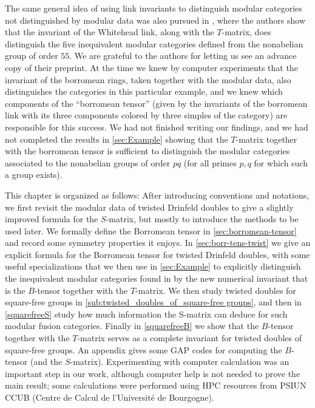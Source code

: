 \documentclass[a4paper, 10pt]{book}
\theoremstyle{definition}
\numberwithin{equation}{chapter}
\begin{document}
The same general idea of using link invariants to distinguish modular categories not distinguished by modular data was also pursued in \cite{2018arXiv180505736B}, where the authors show that the invariant of the Whitehead link, along with the $T$-matrix, does distinguish the five inequivalent modular categories defined from the nonabelian group of order $55$. We are grateful to the authors for letting us see an advance copy of their preprint. At the time we knew by computer experiments that the invariant of the borromean rings, taken together with the modular data, also distinguishes the categories in this particular example, and we knew which components of the ``borromean tensor'' (given by the invariants of the borromean link with its three components colored by three simples of the category) are responsible for this success. We had not finished writing our findings, and we had not completed the results in \cref{sec:Example} showing that the $T$-matrix together with the borromean tensor is sufficient to distinguish the modular categories associated to the nonabelian groups of order $pq$ (for all primes $p,q$ for which such a group exists).

This chapter is organized as follows: After introducing conventions and notations, we first revisit the modular data of twisted Drinfeld doubles to give a slightly improved formula for the $S$-matrix, but mostly to introduce the methods to be used later. We formally define the Borromean tensor in \cref{sec:borromean-tensor} and record some symmetry properties it enjoys. In \cref{sec:borr-tens-twist} we give an explicit formula for the Borromean tensor for twisted Drinfeld doubles, with some useful specializations that we then use in \cref{sec:Example} to explicitly distinguish the inequivalent modular categories found in \cite{2017arXiv170802796M} by the new numerical invariant that is the $B$-tensor together with the $T$-matrix. We then study twisted doubles for square-free groups in \cref{sub:twisted_doubles_of_square-free groups}, and then in \cref{squarefreeS} study how much information the S-matrix can deduce for such modular fusion categories. Finally in \cref{squarefreeB} we show that the $B$-tensor together with the $T$-matrix serves as a complete invariant for twisted doubles of square-free groups. An appendix gives some GAP codes for computing the $B$-tensor (and the $S$-matrix). Experimenting with computer calculation was an important step in our work, although computer help is not needed to prove the main result; some calculations were performed using HPC resources from PSIUN CCUB (Centre de Calcul de
l'Université de Bourgogne).
\end{document}
